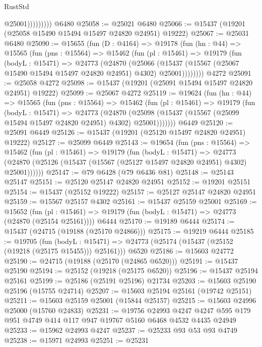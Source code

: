 \begin{lexlean}{RustStd}
\begin{coremodule}
                      @25001)))))))))
    @6480
@25058 := @25021 @6480
@25066 := @15437 (@19201 (@25058 @15490 @15494 @15497 @24820 @24951) @19222)
@25067 := @25031 @6480
@25090 := @15655
    (fun (D : @4164) =>
    @19178
      (fun (hn : @44) =>
      @15565
        (fun (pns : @15564) =>
        @15462
          (fun (pl : @15461) =>
          @19179
            (fun (bodyL : @15471) =>
            @24773
              (@24870
                (@25066
                  (@15437 (@15567 (@25067 @15490 @15494 @15497 @24820 @24951) @4302) @25001))))))))
    @4272
@25091 := @25058 @4272
@25098 := @15437 (@19201 (@25091 @15494 @15497 @24820 @24951) @19222)
@25099 := @25067 @4272
@25119 := @19624
    (fun (hn : @44) =>
    @15565
      (fun (pns : @15564) =>
      @15462
        (fun (pl : @15461) =>
        @19179
          (fun (bodyL : @15471) =>
          @24773
            (@24870
              (@25098 (@15437 (@15567 (@25099 @15494 @15497 @24820 @24951) @4302) @25001)))))))
    @6449
@25120 := @25091 @6449
@25126 := @15437 (@19201 (@25120 @15497 @24820 @24951) @19222)
@25127 := @25099 @6449
@25143 := @19654
    (fun (pns : @15564) =>
    @15462
      (fun (pl : @15461) =>
      @19179
        (fun (bodyL : @15471) =>
        @24773 (@24870 (@25126 (@15437 (@15567 (@25127 @15497 @24820 @24951) @4302) @25001))))))
@25147 := @79 @6428 (@79 @6436 @81)
@25148 := @25143 @25147
@25151 := @25120 @25147 @24820 @24951
@25152 := @19201 @25151
@25154 := @15437 (@25152 @19222)
@25157 := @25127 @25147 @24820 @24951
@25159 := @15567 @25157 @4302
@25161 := @15437 @25159 @25001
@25169 := @15652
    (fun (pl : @15461) => @19179 (fun (bodyL : @15471) => @24773 (@24870 (@25154 @25161))))
    @6444
@25170 := @19189 @6444
@25174 := @15437 (@24715 (@19188 (@25170 @24866)))
@25175 := @19219 @6444
@25185 := @19705
    (fun (bodyL : @15471) => @24773 (@25174 (@15437 (@25152 (@19218 (@25175 @15455))) @25161)))
    @6520
@25186 := @15603 @24772
@25190 := @24715 (@19188 (@25170 (@24865 @6520)))
@25191 := @15437 @25190
@25194 := @25152 (@19218 (@25175 @6520))
@25196 := @15437 @25194 @25161
@25199 := @25186 (@25191 @25196) @21734
@25203 := @15603 @25190 @25196 (@15755 @24714)
@25207 := @15603 @25194 @25161 (@19742 @25151)
@25211 := @15603 @25159 @25001 (@15844 @25157)
@25215 := @15603 @24996 @25000 (@15760 @24833)
@25231 := @19756
    @24993
    @4247
    @4247
    @595
    @179
    @951
    @4749
    @414
    @117
    @947
    @19767
    @5160
    @6468
    @4532
    @4435
    @24949
@25233 := @15962 @24993 @4247
@25237 := @25233 @93 @53 @93 @4749
@25238 := @15971 @24993
@25251 := @25231

\end{coremodule}
\end{lexlean}

